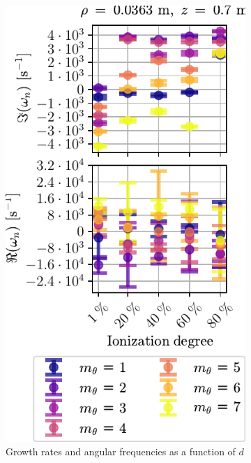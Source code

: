 %
\begin{figure}[htbp]
    \centering
    \begin{subfigure}[h]{0.45\textwidth}
       \centering
       \includegraphics{fig/results/neutral/growthRatesNnModes}
       \caption{Growth rates and angular frequencies as a function of $d$}
       \label{fig:grNnModeNr}
    \end{subfigure}
    \hfill
    \begin{subfigure}[h]{0.45\textwidth}
        \centering

\end{subfigure}
\end{figure}

